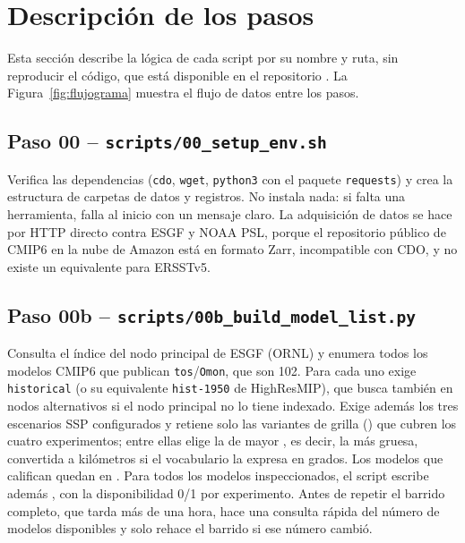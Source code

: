 \section{Descripción de los pasos}
\label{sec:scripts}

Esta sección describe la lógica de cada script por su nombre y ruta, sin reproducir el código, que está disponible en el repositorio . La Figura~\ref{fig:flujograma} muestra el flujo de datos entre los pasos.

\subsection{Paso 00 -- \texttt{scripts/00\_setup\_env.sh}}
Verifica las dependencias (\texttt{cdo}, \texttt{wget}, \texttt{python3} con el paquete \texttt{requests}) y crea la estructura de carpetas de datos y registros. No instala nada: si falta una herramienta, falla al inicio con un mensaje claro. La adquisición de datos se hace por HTTP directo contra ESGF y NOAA PSL, porque el repositorio público de CMIP6 en la nube de Amazon está en formato Zarr, incompatible con CDO, y no existe un equivalente para ERSSTv5.

\subsection{Paso 00b -- \texttt{scripts/00b\_build\_model\_list.py}}
\label{sec:paso00b}
Consulta el índice del nodo principal de ESGF (ORNL) y enumera todos los modelos CMIP6 que publican \texttt{tos}/\texttt{Omon}, que son 102. Para cada uno exige \texttt{historical} (o su equivalente \texttt{hist-1950} de HighResMIP), que busca también en nodos alternativos si el nodo principal no lo tiene indexado. Exige además los tres escenarios SSP configurados y retiene solo las variantes de grilla () que cubren los cuatro experimentos; entre ellas elige la de mayor , es decir, la más gruesa, convertida a kilómetros si el vocabulario la expresa en grados. Los modelos que califican quedan en . Para todos los modelos inspeccionados, el script escribe además , con la disponibilidad 0/1 por experimento. Antes de repetir el barrido completo, que tarda más de una hora, hace una consulta rápida del número de modelos disponibles y solo rehace el barrido si ese número cambió.

